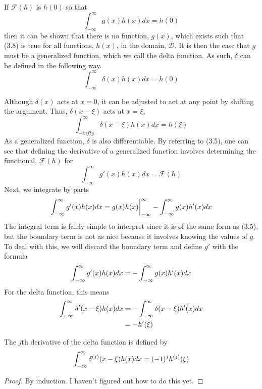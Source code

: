 If \(\mathcal{F}(h)\) is \(h(0)\) so that
\begin{equation}
    \int_{-\infty}^{\infty}g(x)h(x) dx=h(0)
\end{equation}
then it can be shown that there is no function, \(g(x)\), which exists such that (3.8) is true for all functions, \(h(x)\), in the domain, \(\mathcal{D}\). It is then the case that \(g\) must be a generalized function, which we call the delta function. As such, \(\delta\) can be defined in the following way.
\begin{equation}
    \int_{-\infty}^{\infty} \delta(x)h(x) dx = h(0)
\end{equation}

Although \(\delta(x)\) acts at \(x=0\), it can be adjusted to act at any point by shifting the argument. Thus, \(\delta(x-\xi)\) acts at \(x=\xi\),
\begin{equation}
    \int_{-infty}^{\infty} \delta(x-\xi)h(x)dx = h(\xi)
\end{equation}
As a generalized function, \(\delta\) is also differentiable. By referring to (3.5), one can see that defining the derivative of a generalized function involves determining the functional, \(\mathcal{F}(h)\) for
\begin{equation}
    \int_{-\infty}^{\infty} g'(x)h(x) dx= \mathcal{F}(h)
\end{equation}
Next, we integrate by parts
\begin{equation}
    \int_{-\infty}^{\infty} g'(x)h(x)dx = g(x)h(x)\biggr\rvert_{-\infty}^{\infty} - \int_{-\infty}^{\infty} g(x)h'(x)dx
\end{equation}
The integral term is fairly simple to interpret since it is of the same form as (3.5), but the boundary term is not as nice because it involves knowing the values of \(g\). To deal with this, we will discard the boundary term and define \(g'\) with the formula
\begin{equation}
    \int_{-\infty}^{\infty} g'(x)h(x)dx = -\int_{-\infty}^{\infty} g(x)h'(x)dx
\end{equation}
For the delta function, this means
\begin{equation}
    \begin{split}
        \int_{-\infty}^{\infty} \delta'(x-\xi)h(x)dx &= -\int_{-\infty}^{\infty}\delta(x-\xi)h'(x)dx\\
        &=-h'(\xi)
    \end{split}
\end{equation}


\begin{theorem}
    The \(j\)th derivative of the delta function is defined by
    \begin{equation}
         \int_{-\infty}^{\infty} \delta^{(j)}(x-\xi)h(x)dx = (-1)^jh^{(j)}(\xi)
    \end{equation}
\end{theorem}
\begin{proof}
    By induction. I haven't figured out how to do this yet.
\end{proof}

